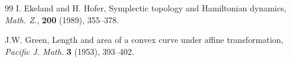 \documentclass[12pt]{amsart}
\theoremstyle{definition}
\newcommand{\CC}{{\mathbb C}}
\begin{document}
\begin{thebibliography} {99}
 I. Ekeland and H. Hofer, Symplectic topology and
Hamiltonian dynamics, {\it Math. Z.}, \textbf{200} (1989), 355--378.















 J.W. Green, Length and area of a convex curve under affine transformation, {\it Pacific J. Math.} \textbf{3} (1953), 393--402. 




\end{thebibliography}
\end{document}
